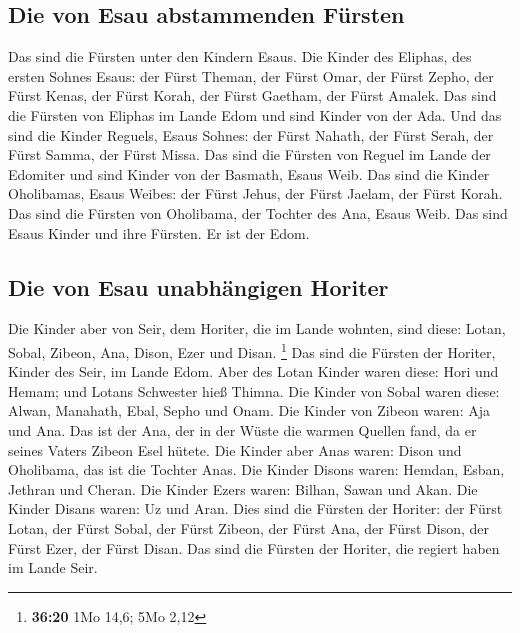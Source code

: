 \hypertarget{die-von-esau-abstammenden-fuxfcrsten}{%
\subsection{Die von Esau abstammenden
Fürsten}\label{die-von-esau-abstammenden-fuxfcrsten}}

 Das sind die Fürsten unter den Kindern Esaus. Die Kinder
des Eliphas, des ersten Sohnes Esaus: der Fürst Theman, der Fürst Omar,
der Fürst Zepho, der Fürst Kenas,  der Fürst Korah, der
Fürst Gaetham, der Fürst Amalek. Das sind die Fürsten von Eliphas im
Lande Edom und sind Kinder von der Ada.  Und das sind die
Kinder Reguels, Esaus Sohnes: der Fürst Nahath, der Fürst Serah, der
Fürst Samma, der Fürst Missa. Das sind die Fürsten von Reguel im Lande
der Edomiter und sind Kinder von der Basmath, Esaus Weib.
 Das sind die Kinder Oholibamas, Esaus Weibes: der Fürst
Jehus, der Fürst Jaelam, der Fürst Korah. Das sind die Fürsten von
Oholibama, der Tochter des Ana, Esaus Weib.  Das sind
Esaus Kinder und ihre Fürsten. Er ist der Edom.

\hypertarget{die-von-esau-unabhuxe4ngigen-horiter}{%
\subsection{Die von Esau unabhängigen
Horiter}\label{die-von-esau-unabhuxe4ngigen-horiter}}

 Die Kinder aber von Seir, dem Horiter, die im Lande
wohnten, sind diese: Lotan, Sobal, Zibeon, Ana, Dison, Ezer und Disan.
\footnote{\textbf{36:20} 1Mo 14,6; 5Mo 2,12}  Das sind
die Fürsten der Horiter, Kinder des Seir, im Lande Edom. 
Aber des Lotan Kinder waren diese: Hori und Hemam; und Lotans Schwester
hieß Thimna.  Die Kinder von Sobal waren diese: Alwan,
Manahath, Ebal, Sepho und Onam.  Die Kinder von Zibeon
waren: Aja und Ana. Das ist der Ana, der in der Wüste die warmen Quellen
fand, da er seines Vaters Zibeon Esel hütete.  Die Kinder
aber Anas waren: Dison und Oholibama, das ist die Tochter Anas.
 Die Kinder Disons waren: Hemdan, Esban, Jethran und
Cheran.  Die Kinder Ezers waren: Bilhan, Sawan und Akan.
 Die Kinder Disans waren: Uz und Aran. 
Dies sind die Fürsten der Horiter: der Fürst Lotan, der Fürst Sobal, der
Fürst Zibeon, der Fürst Ana,  der Fürst Dison, der Fürst
Ezer, der Fürst Disan. Das sind die Fürsten der Horiter, die regiert
haben im Lande Seir.

